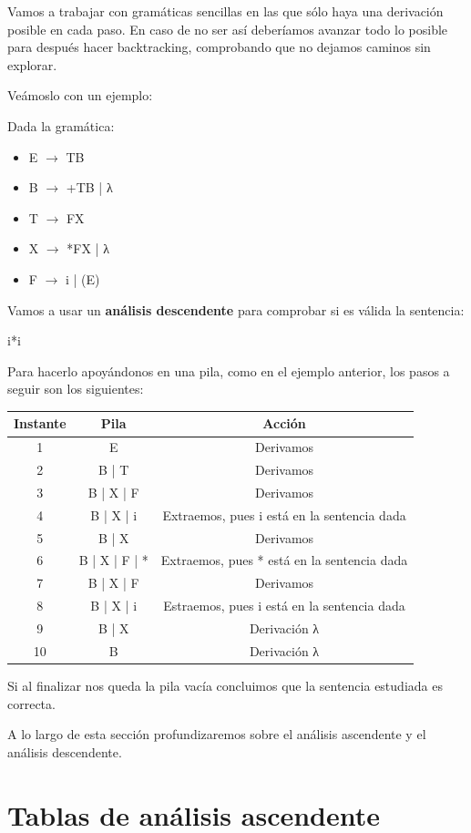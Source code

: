 \documentclass{apuntes}
\begin{document}
Vamos a trabajar con gramáticas sencillas en las que sólo haya una derivación posible en cada paso. En caso de no ser así deberíamos avanzar todo lo posible para después hacer backtracking, comprobando que no dejamos caminos sin explorar.

Veámoslo con un ejemplo:
\begin{example}
Dada la gramática:
\begin{itemize}
\item E $\rightarrow$ TB
\item B $\rightarrow$ +TB | λ
\item T $\rightarrow$ FX
\item X $\rightarrow$ *FX | λ
\item F $\rightarrow$ i | (E)
\end{itemize}
Vamos a usar un \textbf{análisis descendente} para comprobar si es válida la sentencia:
\begin{center}
i*i
\end{center}
Para hacerlo apoyándonos en una pila, como en el ejemplo anterior, los pasos a seguir son los siguientes:

\begin{tabular}{| c | c | c |}
\hline
Instante & Pila & Acción\\
\hline
1 & E & Derivamos\\
\hline
2 & B | T & Derivamos \\
\hline
3 & B | X | F & Derivamos\\
\hline
4 & B | X | i & Extraemos, pues i está en la sentencia dada\\
\hline
5 & B | X & Derivamos \\
\hline
6 & B | X | F | * & Extraemos, pues * está en la sentencia dada \\
\hline
7 & B | X | F & Derivamos \\
\hline
8 & B | X | i & Estraemos, pues i está en la sentencia dada \\
\hline
9 & B | X & Derivación λ\\
\hline
10 & B & Derivación λ \\
\hline
\end{tabular}

Si al finalizar nos queda la pila vacía concluimos que la sentencia estudiada es correcta.
\end{example}


A lo largo de esta sección profundizaremos sobre el análisis ascendente y el análisis descendente.


\section{Tablas de análisis ascendente}
\end{document}
